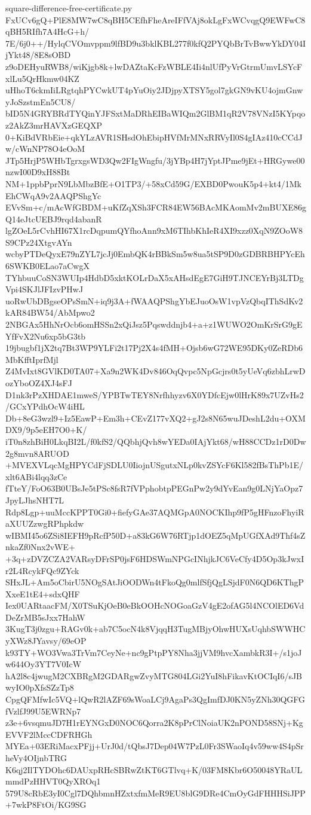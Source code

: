 \documentclass[11pt]{article}
\theoremstyle{definition}
\theoremstyle{remark}
\begin{document}
\begin{filecontents*}[overwrite]{square-difference-free-certificate.py}
FxUCv6gQ+PlE8MW7wC8qBH5CEfhFheAreIFfVAj8okLgFxWCvqgQ9EWFwC8qBH5RIfh7A4HcG+h/
7E/6j0++/HylqCVOmvppm9lfBD9u3bklKBL277f0kfQ2PYQbBrTvBwwYkDY04IjYkt48/8E8sOBD
z9oDEHyuRWB8/wiKjgb8k+lwDAZtaKcFzWBLE4Ii4nlUfPyVrGtrmUmvLSYcFxlLu5QrHkmw04KZ
uHhoT6ckmIiLRgtqhPYCwkUT4pYuOiy2JDjpyXTSY5gol7gkGN9vKU4ojmGnwyJoSzstmEn5CU8/
bID5N4GRYBRdTYQinYJFSxtMaDRhEIBaWIQm2GlBM1qR2V78VNzI5KYpqoz2AkZ3mrHAVXzGEQXP
0+KiBdVRbEie+qkYLzAVR1SHsdOhEbipHVfMrMNxRRVyIl0S4gIAz410cCCdJw/cWnNP78O4eOoM
JTp5HrjP5WHbTgrxgsWD3Qw2FIgWngfu/3jYBp4H7jYptJPme9jEt+HRGywe00nzwI00D9xH88Bt
NM+1ppbPprN9LbMbzBfE+O1TP3/+58xCd59G/EXBD0PwouK5p4+kt4/1MkEhCWqA9v2AAQPShgYc
EVvSm+c/mAcWfGBDM+uKfZqXSh3FCR84EW56BAcMKAomMv2mBUXE86gQ14eJtcUEBJ9rqd4abanR
lgZOeL5rCvhHI67X1rcDqpumQYfhoAnn9xM6TIhbKhIeR4XI9xzz0XqN9ZOoW8S9CPz24XtgvAYn
wcbyPTDeQyxE79nZYL7jcJj0EmbQK4rBBkSm5w8ua5tSP9D0zGDBRBHPYcEh6SWKB0ELao7aCwgX
TYhbuuCoSN3WUIp4HdbD5xktKOLrDaX5xAHsdEgE7GiH9TJNCEYrBj3LTDgVpi4SKJlJFIzvPHwJ
uoRwUbDBgseOPsSmN+iq9j3A+fWAAQPShgYbEJuoOsW1vpVzQbqIThSdKv2kAR84BW54/AbMpwo2
2NBGAx5HhNrOcb6omHSSn2xQiJsz5Pqswddnjb4+a+z1WUWO2OmKrSrG9gEYfFvX2Nu6xp5bG3tb
19jbugbf1jX2tq7Bt3WP9YLFi2t17Pj2X4s4fMH+Ojsb6wG72WE95DKy0ZeRDb6MbKfftIprfMjl
Z4MvIxt8GVlKD0TA07+Xa9n2WK4Dv846OqQvpc5NpGcjrs0t5yUeVq6zbhLrwDozYboOZ4XJ4sFJ
D1nk3rPzXHDAE1mweS/YPBTwTEY8Nrfhhyzv6X0YDfcEjw0lHrK89x7UZvHs2/GCxYPdhOcW4iHL
Db+8eG3wzl9+Iz5EawP+Em3h+CEvZ177vXQ2+gJ2s8N65wuJDeshL2du+OXMDX9/9p5eEH7O0+K/
iT0n8zhBiH0LkqBI2L/f0kfS2/QQbhjQvh8wYEDa0IAjYkt68/wH88CCDz1rD0Dw2g8mvn8ARUOD
+MVEXVLqcMgHPYCdFjSDLU0IiojnUSgutxNLp0kvZSYcF6Kl582fBsThPb1E/xlt6ABi4lqq3zCe
fTteY/FoO63B0UBsJe5tPSc8fsR7fVPphobtpPEGnPw2y9dYvEan9g0LNjYaOpz7JpyLJhsNHT7L
Rdp8Lgp+uuMccKPPT0Gi0+fiefyGAe37AQMGpA0NOCKIhp9fP5gHFnzoFhyiRaXUUZzwgRPhpkdw
wIBMI45o6ZSi8IEFH9pRcfP50D+a83kG6W76RTjp1dOEZ5qMpUGfXAd9Thf4sZnkaZf0Nnx2vWE+
+3q+zDVZCZA2VARsyDFrSP0jsF6HDSWmNPGcINhjkJC6VeCfy4D5Op3kJwxIr2L4RcykFQc9ZYck
SHxJL+Am5oCbirU5NOgSAtJiOODWn4tFkoQg0mlfSfjQgLSjdF0N6QD6KThgPXxeE1tE4+sdxQHF
Iex0UARtaacFM/X0TSuKjOeB0eBkOOHcNOGoaGzV4gE2ofAG5l4NCOlED6VdDeZrMB5sJxx7HahW
3KugT3j0zgu+RAGv0k+ab7C5ocN4k8VjqqH3TugMBjyOhwHUXsUqhbSWWHCyXWz8JYavsy/69eOP
k93TY+WO3Vwa3TrVm7CeyNe+nc9gPtpPY8Nha3jjVM9hvcXambkR3I+/s1joJw644Oy3YT7V0IcW
hA2l8c4jwugM2CXBRgM2GDARgwZvyMTG804LGi2YuI8hFikavKtOCIqI6/sJBwyIO0pXfsSZzTp8
CpgQFMfwIc5VQ+lQwR2lAZF69sWoaLCj9AgaPs3QgImfDJ0KN5yZNh30QGFGfVzlfJ99U5EWRNp7
z3e+6vsqmuJD7H1rEYNGxD0NOC6Qorra2K8pPrClNoiaUK2nPOND58SNj+KgEVVF2lMccCDFRHGh
MYEa+03ERiMacxPFjj+UrJ0d/tQbsJ7Dep04W7PzL0Fr3SWaoIq4v59ww4S4pSrheVy4OIjnbTRG
K6qj2IlTYDOhc6DAUxpRHcSBRwZtKT6GTlvq+K/03FM8Kbr6O50048YRaULmmdPzHHVT0QyXROq1
579U8cRbE3yI0Cgl7DQhbmnHZxtxfmMeR9EU8blG9DRe4CmOyGdFHHHSiJPP+7wkP8FtOi/KG9SG

\end{filecontents*}
\end{document}
